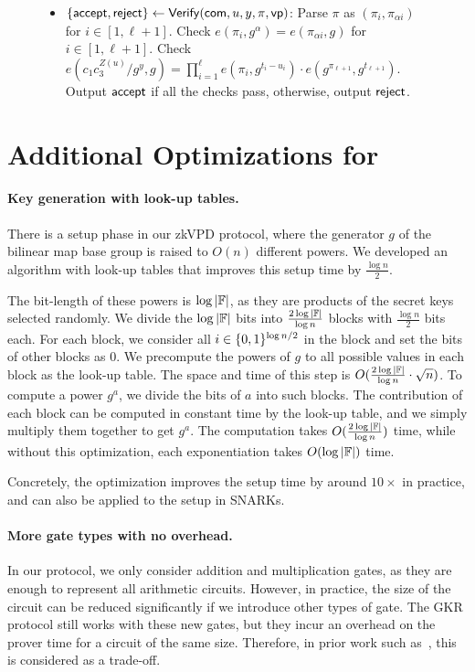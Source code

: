 \begin{figure}[t!]
{{{{\begin{construction}
\begin{itemize}
							\item $\{\mathsf{accept},\mathsf{reject}\}\leftarrow\mathsf{Verify}({{\sf com}},u,y,\pi,\mathsf{vp})$: Parse $\pi$ as $(\pi_i,\pi_{\alpha i})$ for $i\in[1,\ell+1]$. Check $e(\pi_i,g^\alpha) = e(\pi_{\alpha i},g)$ for $i\in[1,\ell+1]$. Check $e(c_1c_3^{Z(u)}/g^y, g) = \prod_{i=1}^\ell e(\pi_i, g^{t_i-u_i}) \cdot e(g^{\pi_{\ell+1}},g^{t_{\ell+1}})$. Output $\mathsf{accept}$ if all the checks pass, otherwise, output $\mathsf{reject}$.
							
							
						\end{itemize} 
						
	\end{construction}}}}}
\end{figure}

\section{Additional Optimizations for \name}\label{app:opt}

\paragraph{Key generation with look-up tables.} There is a setup phase in our zkVPD protocol, where the generator $g$ of the bilinear map base group is raised to $O(n)$ different powers. We developed an algorithm with look-up tables that improves this setup time by $\frac{\log n}{2}$. 

The bit-length of these powers is $\log |\mathbb{F}|$, as they are products of the secret keys selected randomly. We divide the $\log|\mathbb{F}|$ bits into $\frac{2\log|\mathbb{F}|}{\log n}$ blocks with $\frac{\log n}{2}$ bits each. For each block, we consider all $i\in\{0,1\}^{\log n/2}$ in the block and set the bits of other blocks as 0. We precompute the powers of $g$ to all possible values in each block as the look-up table. The space and time of this step is $O(\frac{2\log|\mathbb{F}|}{\log n}\cdot\sqrt{n})$. To compute a power $g^a$, we divide the bits of $a$ into such blocks. The contribution of each block can be computed in constant time by the look-up table, and we simply multiply them together to get $g^a$. The computation takes $O(\frac{2\log|\mathbb{F}|}{\log n})$ time, while without this optimization, each exponentiation takes $O(\log |\mathbb{F}|)$ time.

Concretely, the optimization improves the setup time by around $10\times$ in practice, and can also be applied to the setup in SNARKs.

\paragraph{More gate types with no overhead.} In our protocol, we only consider addition and multiplication gates, as they are enough to represent all arithmetic circuits. However, in practice, the size of the circuit can be reduced significantly if we introduce other types of gate. The GKR protocol still works with these new gates, but they incur an overhead on the prover time for a circuit of the same size. Therefore, in prior work such as~\cite{wahby2016verifiable,vram}, this is considered as a trade-off.

